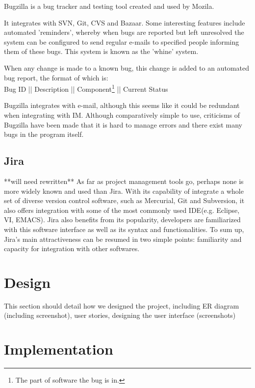 \documentclass[a4paper]{l3proj}
\begin{document}
Bugzilla is a bug tracker and testing tool created and used by Mozila.

It integrates with SVN, Git, CVS and Bazaar.  Some interesting
features include automated 'reminders', whereby when bugs are
reported but left unresolved the system can be configured to send
regular e-mails to specified people informing them of these bugs.
This system is known as the 'whine' system.  

When any change is made to a known bug, this change is added to an
automated bug report, the format of which is:\\
Bug ID || Description || Component\footnote{The part of software the
  bug is in.} || Current Status

Bugzilla integrates with e-mail, although this seems like it could be
redundant when integrating with IM.  
Although comparatively simple to use, criticisms of Bugzilla have been
made that it is hard to manage errors and there exist many bugs in the
program itself.  


\section{Jira}
\label{jira}
**will need rewritten**
As far as project management tools go, perhaps none is more widely known and used than Jira. 
With its capability of integrate a whole set of diverse version control software, such as Mercurial, 
Git and Subversion, it also offers integration with some of the most commonly used IDE(e.g. Eclipse, VI, EMACS). 
Jira also benefits from its popularity, developers are familiarized with this software interface as well as its 
syntax and functionalities. To sum up, Jira’s main attractiveness can be resumed in two simple points: familiarity
and capacity for integration with other softwares.


\chapter{Design}
\label{design}

This section should detail how we designed the project, including ER diagram (including screenshot),
user stories, designing the user interface (screenshots)

\chapter{Implementation}
\label{impl}
\end{document}
